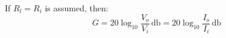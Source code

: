 \begin{multicols}{2}
\begin{CheatsheetEntryFrame}
        If $R_l = R_i$ is assumed, then:
        \begin{equation*}
            G
            = 20 \log_{10}\frac{V_o}{V_i} \,\unit{\decibel}
            = 20 \log_{10}\frac{I_o}{I_i} \,\unit{\decibel}
        \end{equation*}


    \end{CheatsheetEntryFrame}

\end{multicols}

